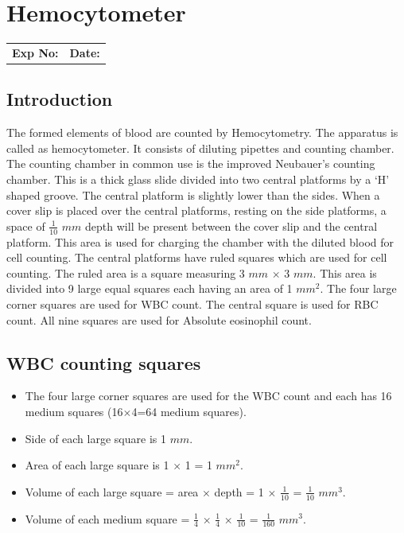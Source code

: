 \documentclass[a4paper,12pt,openany,twoside]{book}
\begin{document}
			\chapter*{\centering Hemocytometer}

			\begin{tabular}{p{4.5in} p{1in}}
				\textbf{Exp No:}  & \textbf{Date:}\\
			\end{tabular}



					\section*{Introduction}
					The formed elements of blood are counted by Hemocytometry. The apparatus is called as hemocytometer. It consists of diluting pipettes and counting chamber.
					The counting chamber in common use is the improved Neubauer’s counting chamber. This is a thick glass slide divided into two central platforms by a ‘H’ shaped groove. The central platform is slightly lower than the sides. When a cover slip is placed over the central platforms, resting on the side platforms, a space of $\frac{1}{10}$  $mm$ depth will be present between the cover slip and the central platform. This area is used for charging the chamber with the diluted blood for cell counting.
					The central platforms have ruled squares which are used for cell counting. The ruled area is a square measuring 3 $mm$ $\times$ 3 $mm$. This area is divided into 9 large equal squares each having an area of 1 $mm$$^2$. The four large corner squares are used for WBC count. The central square is used for RBC count. All nine squares are used for Absolute eosinophil count.

					\section*{WBC counting squares}
					\begin{itemize}
						\item
							The four large corner squares are used for the WBC count and each has 16 medium squares (16$\times$4=64 medium squares).
						\item {
								Side of each large square is 1 $mm$.}
							\item{
									Area of each large square is 1 $\times$ 1 = 1 $mm$$^{2}$.}
								\item {
										Volume of each large square = area $\times$ depth = 1 $\times$ $\frac{1}{10}$ = $\frac{1}{10}$ $mm^3$.}
								\item{
										Volume of each medium square = $\frac{1}{4}$ $\times$ $\frac{1}{4}$ $\times$ $\frac{1}{10}$ = $\frac{1}{160}$ $mm^3$.}
					\end{itemize}
\end{document}
